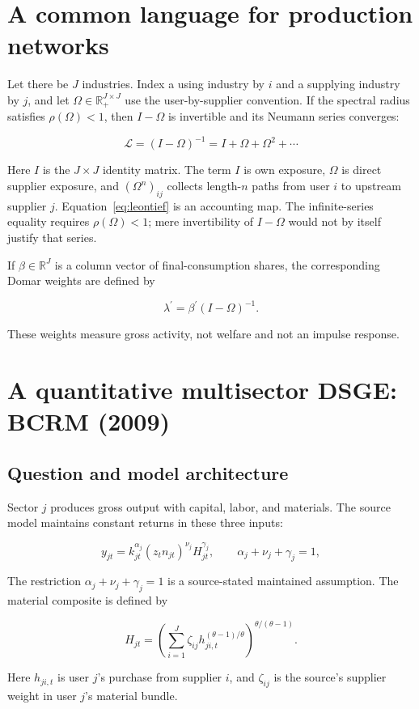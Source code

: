\documentclass{article}
\newcommand{\BCRM}{BCRM}
\begin{document}
\section{A common language for production networks}

Let there be $J$ industries. Index a using industry by $i$ and a supplying
industry by $j$, and let $\Omega\in\mathbb{R}^{J\times J}_{+}$ use the
user-by-supplier convention. If the spectral radius satisfies
$\rho(\Omega)<1$, then $I-\Omega$ is invertible and its Neumann series
converges:

\begin{equation}
  \mathcal{L}=(I-\Omega)^{-1}=I+\Omega+\Omega^2+\cdots
  \label{eq:leontief}
\end{equation}

Here $I$ is the $J\times J$ identity matrix. The term $I$ is own exposure,
$\Omega$ is direct supplier exposure, and $(\Omega^n)_{ij}$ collects length-$n$
paths from user $i$ to upstream supplier $j$. Equation~\eqref{eq:leontief} is
an accounting map. The infinite-series equality requires $\rho(\Omega)<1$;
mere invertibility of $I-\Omega$ would not by itself justify that series.

If $\beta\in\mathbb{R}^{J}$ is a column vector of final-consumption shares, the
corresponding Domar weights are defined by

\begin{equation}
  \lambda^{\prime}=\beta^{\prime}(I-\Omega)^{-1}.
  \label{eq:domar}
\end{equation}

These weights measure gross activity, not welfare and not an impulse response.

\section{A quantitative multisector DSGE: \BCRM{} (2009)}

\subsection{Question and model architecture}

Sector $j$ produces gross output with capital, labor, and materials. The source
model maintains constant returns in these three inputs:

\begin{equation}
  y_{jt}=k_{jt}^{\alpha_j}(z_t n_{jt})^{\nu_j}H_{jt}^{\gamma_j},
  \qquad \alpha_j+\nu_j+\gamma_j=1,
  \label{eq:bcrm-production}
\end{equation}

The restriction $\alpha_j+\nu_j+\gamma_j=1$ is a source-stated maintained
assumption. The material composite is defined by

\begin{equation}
  H_{jt}=\left(\sum_{i=1}^{J}\zeta_{ij}
  h_{ji,t}^{(\theta-1)/\theta}\right)^{\theta/(\theta-1)}.
  \label{eq:bcrm-material}
\end{equation}

Here $h_{ji,t}$ is user $j$'s purchase from supplier $i$, and $\zeta_{ij}$ is
the source's supplier weight in user $j$'s material bundle.
\end{document}
